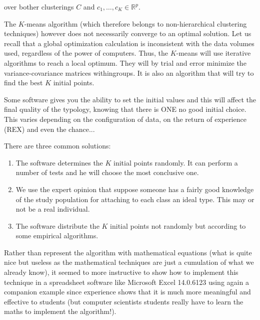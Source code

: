	over bother clusterings $C$ and $c_1,\ldots,c_K\in\mathbb{R}^p$.
	
	The $K$-means algorithm (which therefore belongs to non-hierarchical clustering techniques) however does not necessarily converge to an optimal solution. Let us recall that a global optimization calculation is inconsistent with the data volumes used, regardless of the power of computers. Thus, the $K$-means will use iterative algorithms to reach a local optimum. They will by trial and error minimize the variance-covariance matrices withingroups. It is also an algorithm that will try to find the best $K$ initial points.

	Some software gives you the ability to set the initial values and this will affect the final quality of the typology, knowing that there is ONE no good initial choice. This varies depending on the configuration of data, on the return of experience (REX) and even the chance...
	
	There are three common solutions:
	\begin{enumerate}
		\item The software determines the $K$ initial points randomly. It can perform a number of tests and he will choose the most conclusive one.

		\item We use the expert opinion that suppose someone has a fairly good knowledge of the study population for attaching to each class an ideal type. This may or not be a real individual.

		\item The software distribute the $K$ initial points not randomly but according to some empirical algorithms.
	\end{enumerate}

	Rather than represent the algorithm with mathematical equations (what is quite nice but useless as the mathematical techniques are just a cumulation of what we already know), it seemed to more instructive to show how to implement this technique in a spreadsheet software like Microsoft Excel 14.0.6123 using again a companion example since experience shows that it is much more meaningful and effective to students (but computer scientists students really have to learn the maths to implement the algorithm!).
	
